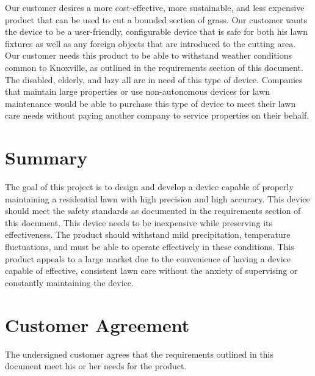 \documentclass[12pt,letterpaper]{article}
\begin{document}
\begin{doublespace}
Our customer desires a more cost-effective, more sustainable, and less expensive product that can be used to cut a bounded section of grass. Our customer wants the device to be a user-friendly, configurable device that is safe for both his lawn fixtures as well as any foreign objects that are introduced to the cutting area. Our customer needs this product to be able to withstand weather conditions common to Knoxville, as outlined in the requirements section of this document. The disabled, elderly, and lazy all are in need of this type of device. Companies that maintain large properties or use non-autonomous devices for lawn maintenance would be able to purchase this type of device to meet their lawn care needs without paying another company to service properties on their behalf. 
\end{doublespace}

\section*{Summary}

\begin{doublespace}
The goal of this project is to design and develop a device capable of properly maintaining a residential lawn with high precision and high accuracy. This device should meet the safety standards as documented in the requirements section of this document. This device needs to be inexpensive while preserving its effectiveness. The product should withstand mild precipitation, temperature fluctuations, and must be able to operate effectively in these conditions. This product appeals to a large market due to the convenience of having a device capable of effective, consistent lawn care without the anxiety of supervising or constantly maintaining the device. 
\end{doublespace}

\newpage
\section*{Customer Agreement}

The undersigned customer agrees that the requirements outlined in this document meet his or her needs for the product.

\end{document}
